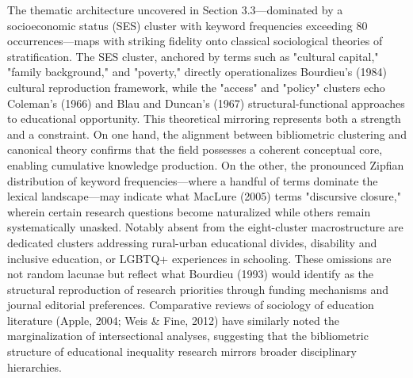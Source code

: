 \documentclass[12pt,a4paper]{article}
\begin{document}
The thematic architecture uncovered in Section 3.3—dominated by a socioeconomic status (SES) cluster with keyword frequencies exceeding 80 occurrences—maps with striking fidelity onto classical sociological theories of stratification. The SES cluster, anchored by terms such as "cultural capital," "family background," and "poverty," directly operationalizes Bourdieu's (1984) cultural reproduction framework, while the "access" and "policy" clusters echo Coleman's (1966) and Blau and Duncan's (1967) structural-functional approaches to educational opportunity. This theoretical mirroring represents both a strength and a constraint. On one hand, the alignment between bibliometric clustering and canonical theory confirms that the field possesses a coherent conceptual core, enabling cumulative knowledge production. On the other, the pronounced Zipfian distribution of keyword frequencies—where a handful of terms dominate the lexical landscape—may indicate what MacLure (2005) terms "discursive closure," wherein certain research questions become naturalized while others remain systematically unasked. Notably absent from the eight-cluster macrostructure are dedicated clusters addressing rural-urban educational divides, disability and inclusive education, or LGBTQ+ experiences in schooling. These omissions are not random lacunae but reflect what Bourdieu (1993) would identify as the structural reproduction of research priorities through funding mechanisms and journal editorial preferences. Comparative reviews of sociology of education literature (Apple, 2004; Weis \& Fine, 2012) have similarly noted the marginalization of intersectional analyses, suggesting that the bibliometric structure of educational inequality research mirrors broader disciplinary hierarchies.
\end{document}
